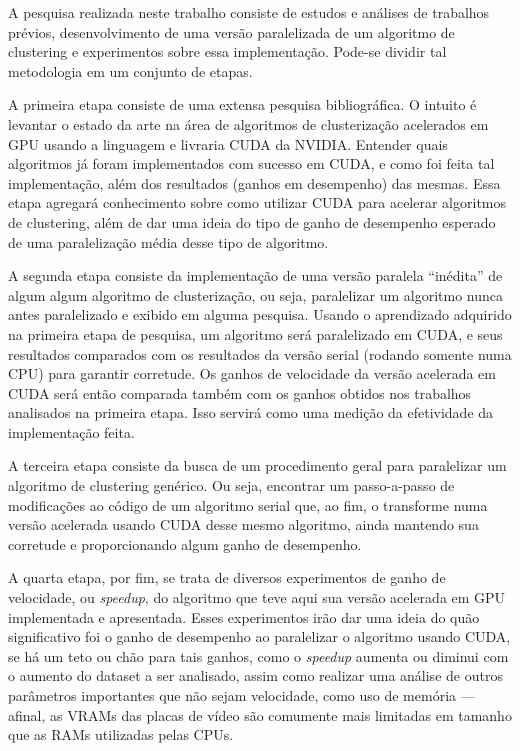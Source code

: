 \documentclass[12pt, %
openright, 
oneside, %
a4paper,    %
brazil]{facom-ufu-abntex2}
\begin{document}

A pesquisa realizada neste trabalho consiste de estudos e análises de trabalhos prévios, desenvolvimento de uma versão paralelizada de um algoritmo de clustering e experimentos sobre essa implementação. Pode-se dividir tal metodologia em um conjunto de etapas.

A primeira etapa consiste de uma extensa pesquisa bibliográfica. O intuito é levantar o estado da arte na área de algoritmos de clusterização acelerados em GPU usando a linguagem e livraria CUDA da NVIDIA. Entender quais algoritmos já foram implementados com sucesso em CUDA, e como foi feita tal implementação, além dos resultados (ganhos em desempenho) das mesmas. Essa etapa agregará conhecimento sobre como utilizar CUDA para acelerar algoritmos de clustering, além de dar uma ideia do tipo de ganho de desempenho esperado de uma paralelização média desse tipo de algoritmo.

A segunda etapa consiste da implementação de uma versão paralela \enquote{inédita} de algum algum algoritmo de clusterização, ou seja, paralelizar um algoritmo nunca antes paralelizado e exibido em alguma pesquisa. Usando o aprendizado adquirido na primeira etapa de pesquisa, um algoritmo será paralelizado em CUDA, e seus resultados comparados com os resultados da versão serial (rodando somente numa CPU) para garantir corretude. Os ganhos de velocidade da versão acelerada em CUDA será então comparada também com os ganhos obtidos nos trabalhos analisados na primeira etapa. Isso servirá como uma medição da efetividade da implementação feita.

A terceira etapa consiste da busca de um procedimento geral para paralelizar um algoritmo de clustering genérico. Ou seja, encontrar um passo-a-passo de modificações ao código de um algoritmo serial que, ao fim, o transforme numa versão acelerada usando CUDA desse mesmo algoritmo, ainda mantendo sua corretude e proporcionando algum ganho de desempenho.

A quarta etapa, por fim, se trata de diversos experimentos de ganho de velocidade, ou \textit{speedup}, do algoritmo que teve aqui sua versão acelerada em GPU implementada e apresentada. Esses experimentos irão dar uma ideia do quão significativo foi o ganho de desempenho ao paralelizar o algoritmo usando CUDA, se há um teto ou chão para tais ganhos, como o \textit{speedup} aumenta ou diminui com o aumento do dataset a ser analisado, assim como realizar uma análise de outros parâmetros importantes que não sejam velocidade, como uso de memória --- afinal, as VRAMs das placas de vídeo são comumente mais limitadas em tamanho que as RAMs utilizadas pelas CPUs.
\end{document}
